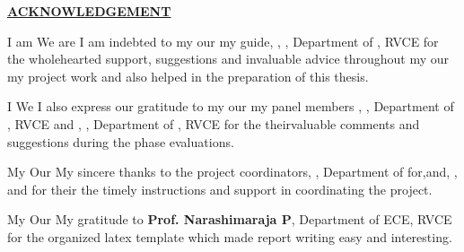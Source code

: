 \thispagestyle{empty}
\ifIDP \vspace{-1cm}\fi
\begin{center}
	\Large\textbf{\underline{ACKNOWLEDGEMENT}} \par
\end{center}

\ifPG I am \else \ifStuNameBUsed We are \else I am \fi\fi indebted to \ifPG my \else\ifStuNameBUsed our \else my \fi\fi guide, \textbf{\printGuideNameA}, \printGuideDesigA, Department of \printGuideDeptAInSF, RVCE for the wholehearted support, suggestions and invaluable advice throughout \ifPG my \else\ifStuNameBUsed our \else my \fi\fi project work and also helped in the preparation of this thesis.\\ \par
\vspace{-5pt}
\ifPG I \else \ifStuNameBUsed We \else I \fi\fi also express our gratitude to \ifPG my \else\ifStuNameBUsed our \else my \fi\fi  panel member\ifIDP\space\else s \fi\textbf{\printPanelMemberA}, \printPanelMemberDesigA, Department of \printPanelMemberDeptAInSF, RVCE \ifIDP \else and \textbf{\printPanelMemberB}, \printPanelMemberDesigB , Department of \printPanelMemberDeptBInSF, RVCE \fi for \ifPanelMemBUsed the \else their\fi valuable comments and suggestions during the phase evaluations. \\ \par
\vspace{-5pt}
\ifPG My \else \ifStuNameBUsed Our \else My \fi\fi sincere thanks to the project coordinator\ifIDP\else\ifProjectMemBUsed s\fi\fi\space \textbf{\printProjectMemberA}, \printPanelMemberDesigA, Department of \printProjectMemberDeptAInSF \ifIDP \space for\space \else\ifProjectMemBUsed \ifProjectMemCUsed,\space \else\space and\space \fi\textbf{\printProjectMemberB}, \printPanelMemberDesigB,  \ifProjectMemCUsed\space and \textbf{\printProjectMemberC} \fi\fi\space for \ifProjectMemBUsed their \else the \fi\fi timely instructions and support in coordinating the project.\\ \par
\vspace{-5pt}
\ifPG My \else \ifStuNameBUsed Our \else My \fi\fi gratitude to \textbf{Prof. Narashimaraja P}, Department of ECE, RVCE for the organized latex template which made report writing easy and interesting.\\ \par

